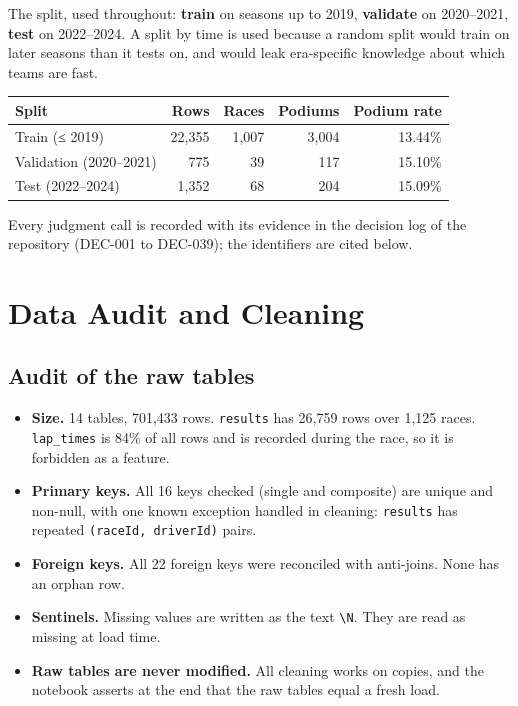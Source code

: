 \documentclass[11pt,a4paper]{article}
\begin{document}
The split, used throughout: \textbf{train} on seasons up to 2019, \textbf{validate} on 2020–2021, \textbf{test} on 2022–2024. A split by time is used because a random split would train on later seasons than it tests on, and would leak era-specific knowledge about which teams are fast.

{\small
\begin{xltabular}{\linewidth}{>{\raggedright\arraybackslash}Xrrrr}
\toprule
\textbf{Split} & \textbf{Rows} & \textbf{Races} & \textbf{Podiums} & \textbf{Podium rate} \\
\midrule
\endhead
Train (≤ 2019) & 22,355 & 1,007 & 3,004 & 13.44\% \\
Validation (2020–2021) & 775 & 39 & 117 & 15.10\% \\
Test (2022–2024) & 1,352 & 68 & 204 & 15.09\% \\
\bottomrule
\end{xltabular}
}

Every judgment call is recorded with its evidence in the decision log of the repository (DEC-001 to DEC-039); the identifiers are cited below.

\section{Data Audit and Cleaning}

\subsection{Audit of the raw tables}

\begin{itemize}
\item \textbf{Size.} 14 tables, 701,433 rows. \texttt{results} has 26,759 rows over 1,125 races. \texttt{lap\_\allowbreak{}times} is 84\% of all rows and is recorded during the race, so it is forbidden as a feature.
\item \textbf{Primary keys.} All 16 keys checked (single and composite) are unique and non-null, with one known exception handled in cleaning: \texttt{results} has repeated \texttt{(raceId, driverId)} pairs.
\item \textbf{Foreign keys.} All 22 foreign keys were reconciled with anti-joins. None has an orphan row.
\item \textbf{Sentinels.} Missing values are written as the text \texttt{\textbackslash{}N}. They are read as missing at load time.
\item \textbf{Raw tables are never modified.} All cleaning works on copies, and the notebook asserts at the end that the raw tables equal a fresh load.
\end{itemize}
\end{document}
